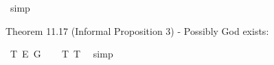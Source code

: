 \begin{isabellebody}
\ simp%
\endisatagproof
{\isafoldproof}%
%
\isadelimproof
%
\endisadelimproof
%
\begin{isamarkuptext}%
Theorem 11.17 (Informal Proposition 3) - Possibly God exists:%
\end{isamarkuptext}\isamarkuptrue%
\isamarkupfalse%
\ T{}{\isacharcolon}\ {\isachardoublequoteopen}{\isasymlfloor}\isactrlbold {\isasymdiamond}\isactrlbold {\isasymexists}\isactrlsup E\ G{\isasymrfloor}{\isachardoublequoteclose}%
\isadelimproof
\ \ %
\endisadelimproof
%
\isatagproof
{}\isamarkupfalse%
\ T{}\ T{}\ \isamarkupfalse%
\ simp\isanewline
%
\endisatagproof
{\isafoldproof}%
%
\isadelimproof
%
\endisadelimproof
%
\isadelimtheory
%
\endisadelimtheory
%
\isatagtheory
%
\endisatagtheory
{\isafoldtheory}%
%
\isadelimtheory
%
\endisadelimtheory
%
\end{isabellebody}%

